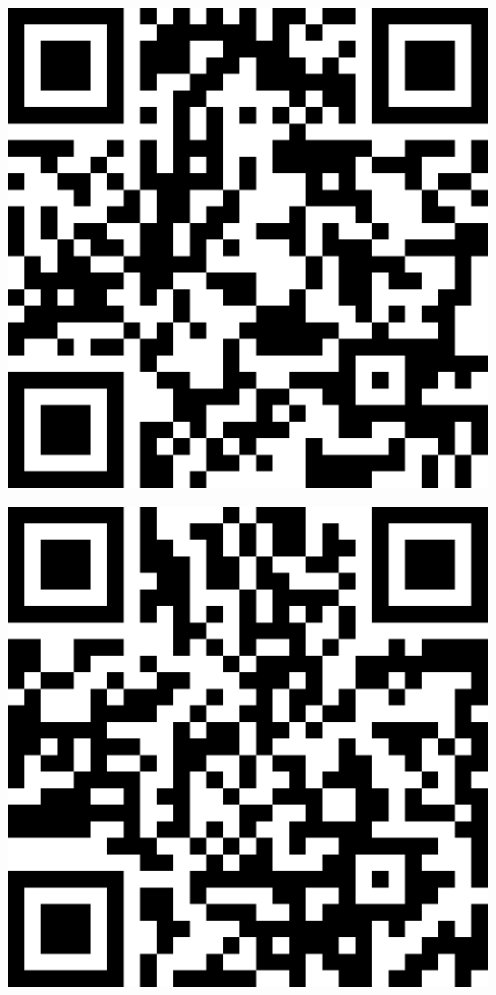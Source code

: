 \documentclass[letterpaper]{article}
\begin{document}
 \endgroup 
 \vspace*{\fill} 
 \pagebreak 
{} 
 \vspace*{\fill} 
 \begingroup 
 \centerline{\includegraphics[scale=1,width=5in,height=5in]{Class3000.png}} 
 \endgroup 
 \vspace*{\fill} 
 \pagebreak 
{} 
 \vspace*{\fill} 
 \begingroup 
 \centerline{\includegraphics[scale=1,width=5in,height=5in]{Class3435N.png}} 
\end{document}
